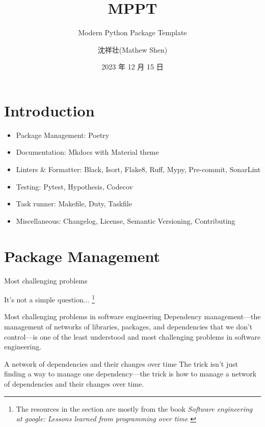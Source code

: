 \documentclass{ctexbeamer}
\title{MPPT}
\subtitle{Modern Python Package Template}
\author{沈祥壮(Mathew Shen)}
\date{2023 年 12 月 15 日}
\begin{document}
\begin{frame}
\titlepage
\end{frame}

\begin{frame}
    \tableofcontents
\end{frame}



\section{Introduction}
\begin{frame}

    \begin{itemize}
        \item Package Management: Poetry
        \item Documentation: Mkdocs with Material theme
        \item Linters \& Formatter: Black, Isort, Flake8, Ruff, Mypy, Pre-commit, SonarLint
        \item Testing: Pytest, Hypothesis, Codecov
        \item Task runner: Makefile, Duty, Taskfile
        \item Miscellaneous: Changelog, License, Semantic Versioning, Contributing
    \end{itemize}

\end{frame}


\section{Package Management}

\begin{frame}{Most challenging problems}

    It's not a simple question...
    \footnote{The resources in the section are mostly from the book
    \textit{Software engineering at google: Lessons learned from programming over time}
    \cite{google-sre}}
    

    \begin{alertblock}{Most challenging problems in software engineering}
        Dependency management—the management of networks of libraries, packages, and dependencies 
        that we don't control—is one of the least understood and most challenging problems 
        in software engineering.
    \end{alertblock}

    \pause

    \begin{exampleblock}{A network of dependencies and their changes over time}
        The trick isn't just finding a way to manage one dependency—the trick is 
        how to manage a network of dependencies and their changes over time.
    \end{exampleblock}

\end{frame}
\end{document}
